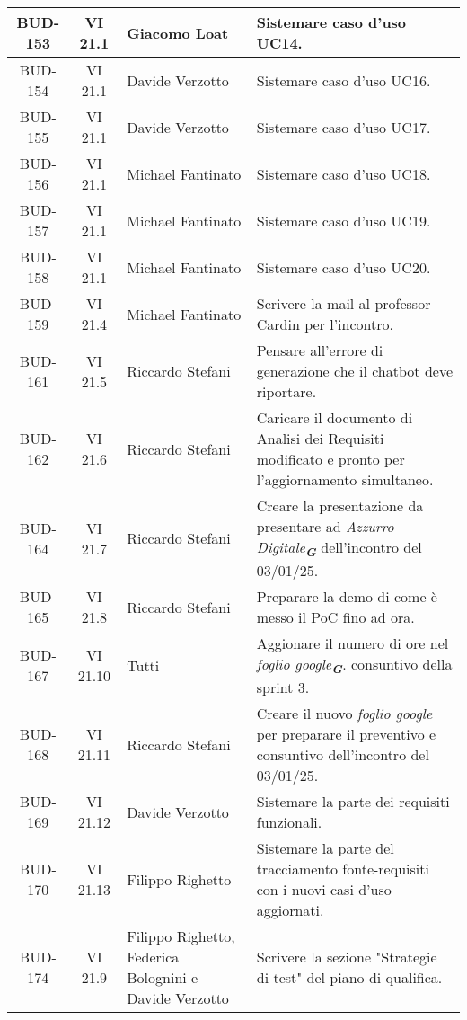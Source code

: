 \begin{table}[htbp]
\begin{tabular}{|c|c|p{}|p{}|}
    \hline
    BUD-153 & VI 21.1 & Giacomo Loat & Sistemare caso d'uso UC14. \\
    \hline
    BUD-154 & VI 21.1 & Davide Verzotto & Sistemare caso d'uso UC16. \\
    \hline
    BUD-155 & VI 21.1 & Davide Verzotto & Sistemare caso d'uso UC17. \\
    \hline
    BUD-156 & VI 21.1 & Michael Fantinato & Sistemare caso d'uso UC18. \\
    \hline
    BUD-157 & VI 21.1 & Michael Fantinato & Sistemare caso d'uso UC19. \\
    \hline
    BUD-158 & VI 21.1 & Michael Fantinato & Sistemare caso d'uso UC20. \\
    \hline
    BUD-159 & VI 21.4 & Michael Fantinato & Scrivere la mail al professor Cardin per l'incontro. \\
    \hline
    BUD-161 & VI 21.5 & Riccardo Stefani & Pensare all'errore di generazione che il chatbot deve riportare. \\
    \hline
    BUD-162 & VI 21.6 & Riccardo Stefani & Caricare il documento di Analisi dei Requisiti modificato e pronto per l'aggiornamento simultaneo. \\
    \hline
    BUD-164 & VI 21.7 & Riccardo Stefani & Creare la presentazione da presentare ad \emph{Azzurro Digitale}\textsubscript{\textit{\textbf{G}}} dell'incontro del 03/01/25. \\
    \hline
    BUD-165 & VI 21.8 & Riccardo Stefani & Preparare la demo di come è messo il PoC fino ad ora. \\
    \hline
    BUD-167 & VI 21.10 & Tutti & Aggionare il numero di ore nel \emph{foglio google}\textsubscript{\textit{\textbf{G}}}. consuntivo della sprint 3. \\
    \hline
    BUD-168 & VI 21.11 & Riccardo Stefani & Creare il nuovo \emph{foglio google} per preparare il preventivo e consuntivo dell'incontro del 03/01/25. \\
    \hline
    BUD-169 & VI 21.12 & Davide Verzotto & Sistemare la parte dei requisiti funzionali. \\
    \hline
    BUD-170 & VI 21.13 & Filippo Righetto & Sistemare la parte del tracciamento fonte-requisiti con i nuovi casi d'uso aggiornati. \\
    \hline
    BUD-174 & VI 21.9 & Filippo Righetto, Federica Bolognini e Davide Verzotto & Scrivere la sezione "Strategie di test" del piano di qualifica. \\
    \hline
    

\end{tabular}
\end{table}



